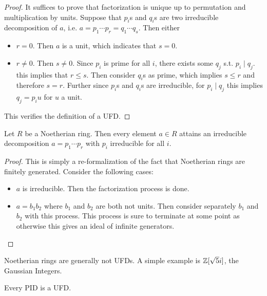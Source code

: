 \documentclass{article}
\begin{document}
\begin{proof}
    It suffices to prove that factorization is unique up to permutation and multiplication by units. Suppose that $p_i$s and $q_i$s are two irreducible decomposition of $a$, i.e. $a = p_1\cdots p_r = q_1 \cdots q_s$. Then either
    \begin{itemize}
        \item $r = 0$. Then $a$ is a unit, which indicates that $s = 0$.
        \item $r\neq 0$. Then $s\neq 0$. Since $p_i$ is prime for all $i$, there exists some $q_j$ s.t. $p_i \mid q_j$. this implies that $r\leq s$. Then consider $q_i$s as prime, which implies $s\leq r$ and therefore $s = r$. Further since $p_i$s and $q_i$s are irreducible, for $p_i \mid q_j$ this implies $q_j = p_i u$ for $u$ a unit. 
    \end{itemize}
    This verifies the definition of a UFD.
\end{proof}

\begin{proposition}\label{prop:Noeth implies decomposition}
    Let $R$ be a Noetherian ring. Then every element $a\in R$ attains an irreducible decomposition $a = p_1\cdots p_r$ with $p_i$ irreducible for all $i$. 
\end{proposition}

\begin{proof}
    This is simply a re-formalization of the fact that Noetherian rings are finitely generated. Consider the following cases:
    \begin{itemize}
        \item $a$ is irreducible. Then the factorization process is done.
        \item $a = b_1 b_2$ where $b_1$ and $b_2$ are both not units. Then consider separately $b_1$ and $b_2$ with this process. This process is sure to terminate at some point as otherwise this gives an ideal of infinite generators.
    \end{itemize}
\end{proof}

\begin{remark}
    Noetherian rings are generally not UFDs. A simple example is $\mathbb{Z}[\sqrt{5}i]$, the Gaussian Integers.
\end{remark}

\begin{theorem}\label{thm:PID is UFD}
    Every PID is a UFD.
\end{theorem}
\end{document}
